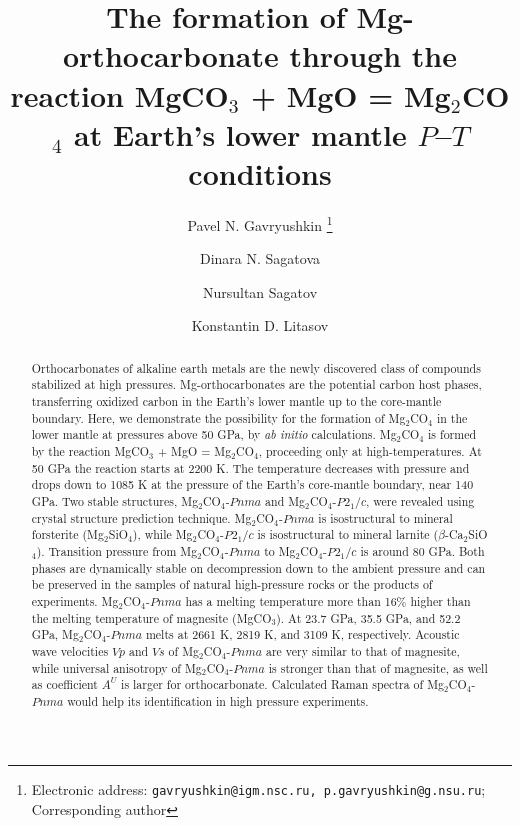 \documentclass[a4paperm]{article}
\begin{document}

\title{The formation of Mg-orthocarbonate through the reaction MgCO$_3$ + MgO = Mg$_2$CO$_4$ at Earth's lower mantle $P$--$T$ conditions}


\author[1,2]{Pavel N. Gavryushkin
   \thanks{Electronic address: \texttt{gavryushkin@igm.nsc.ru, p.gavryushkin@g.nsu.ru}; Corresponding author}}     
\author[1,2]{Dinara N. Sagatova}
\author[1]{Nursultan Sagatov}
\author[3]{Konstantin D. Litasov}


\date{}
\maketitle


\begin{abstract}
Orthocarbonates of alkaline earth metals are the newly discovered class of compounds stabilized at high pressures.
Mg-orthocarbonates are the potential carbon host phases, transferring oxidized carbon in the Earth's lower mantle up to the core-mantle boundary.
Here, we demonstrate the possibility for the formation of Mg$_2$CO$_4$ in the lower mantle at pressures above 50 GPa, by {\it ab initio} calculations.
Mg$_2$CO$_4$ is formed by the reaction MgCO$_3$ + MgO = Mg$_2$CO$_4$, proceeding only at high-temperatures.
At 50 GPa the reaction starts at 2200 K.
The temperature decreases with pressure and drops down to 1085 K at the pressure of the Earth's core-mantle boundary, near 140 GPa.
Two stable structures, Mg$_2$CO$_4$-$Pnma$ and Mg$_2$CO$_4$-$P2_1/c$, were revealed using crystal structure prediction technique.
Mg$_2$CO$_4$-$Pnma$ is isostructural to mineral forsterite (Mg$_2$SiO$_4$), while Mg$_2$CO$_4$-$P2_1/c$ is isostructural to mineral larnite ($\beta$-Ca$_2$SiO$_4$).
Transition pressure from Mg$_2$CO$_4$-$Pnma$ to Mg$_2$CO$_4$-$P2_1/c$ is around 80 GPa.
Both phases are dynamically stable on decompression down to the ambient pressure and can be preserved in the samples of natural high-pressure rocks or the products of experiments.
Mg$_2$CO$_4$-$Pnma$ has a melting temperature more than 16\% higher  than the melting temperature of magnesite (MgCO$_3$).
At 23.7 GPa, 35.5 GPa, and 52.2 GPa, Mg$_2$CO$_4$-$Pnma$  melts at 2661 K, 2819 K, and 3109 K, respectively.
Acoustic wave velocities $Vp$ and $Vs$ of Mg$_2$CO$_4$-$Pnma$ are very similar to that of magnesite, while universal anisotropy of Mg$_2$CO$_4$-$Pnma$ is stronger than that of magnesite, as well as coefficient $A^U$ is larger for orthocarbonate.
Calculated Raman spectra of Mg$_2$CO$_4$-$Pnma$ would help its identification in high pressure experiments.



\end{abstract}
\end{document}
